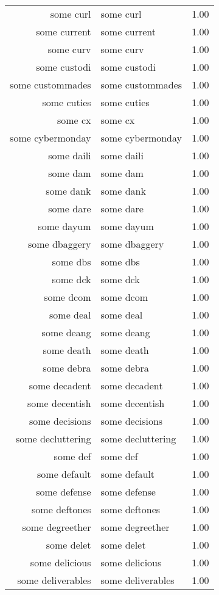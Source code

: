 \begin{table}[ht]
\begin{tabular}{rlr}
  some curl & some curl & 1.00 \\ 
  some current & some current & 1.00 \\ 
  some curv & some curv & 1.00 \\ 
  some custodi & some custodi & 1.00 \\ 
  some custommades & some custommades & 1.00 \\ 
  some cuties & some cuties & 1.00 \\ 
  some cx & some cx & 1.00 \\ 
  some cybermonday & some cybermonday & 1.00 \\ 
  some daili & some daili & 1.00 \\ 
  some dam & some dam & 1.00 \\ 
  some dank & some dank & 1.00 \\ 
  some dare & some dare & 1.00 \\ 
  some dayum & some dayum & 1.00 \\ 
  some dbaggery & some dbaggery & 1.00 \\ 
  some dbs & some dbs & 1.00 \\ 
  some dck & some dck & 1.00 \\ 
  some dcom & some dcom & 1.00 \\ 
  some deal & some deal & 1.00 \\ 
  some deang & some deang & 1.00 \\ 
  some death & some death & 1.00 \\ 
  some debra & some debra & 1.00 \\ 
  some decadent & some decadent & 1.00 \\ 
  some decentish & some decentish & 1.00 \\ 
  some decisions & some decisions & 1.00 \\ 
  some decluttering & some decluttering & 1.00 \\ 
  some def & some def & 1.00 \\ 
  some default & some default & 1.00 \\ 
  some defense & some defense & 1.00 \\ 
  some deftones & some deftones & 1.00 \\ 
  some degreether & some degreether & 1.00 \\ 
  some delet & some delet & 1.00 \\ 
  some delicious & some delicious & 1.00 \\ 
  some deliverables & some deliverables & 1.00 \\ 

\end{tabular}
\end{table}
